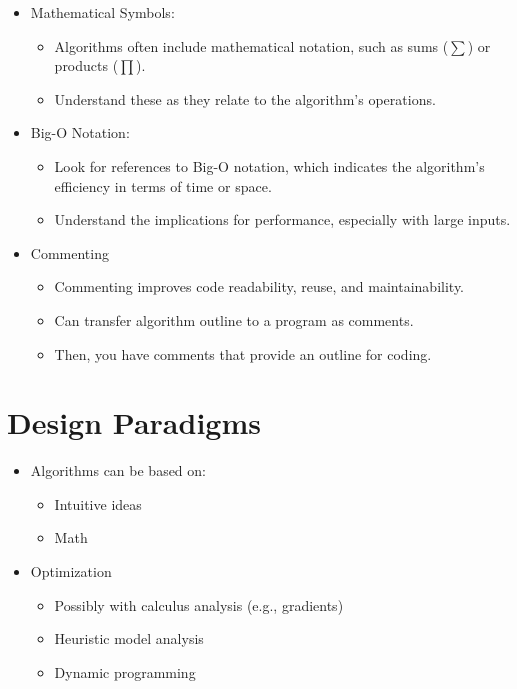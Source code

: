 \documentclass[
  letterpaper,
  DIV=11,
  numbers=noendperiod]{scrreprt}
\providecommand{\tightlist}{%
  \setlength{\itemsep}{0pt}\setlength{\parskip}{0pt}}\usepackage{longtable,booktabs,array}
\begin{document}
\begin{itemize}
\tightlist
\item
  Mathematical Symbols:

  \begin{itemize}
  \tightlist
  \item
    Algorithms often include mathematical notation, such as sums
    (\(\sum\)) or products (\(\prod\)).
  \item
    Understand these as they relate to the algorithm's operations.
  \end{itemize}
\item
  Big-O Notation:

  \begin{itemize}
  \tightlist
  \item
    Look for references to Big-O notation, which indicates the
    algorithm's efficiency in terms of time or space.
  \item
    Understand the implications for performance, especially with large
    inputs.
  \end{itemize}
\item
  Commenting

  \begin{itemize}
  \tightlist
  \item
    Commenting improves code readability, reuse, and maintainability.
  \item
    Can transfer algorithm outline to a program as comments.
  \item
    Then, you have comments that provide an outline for coding.
  \end{itemize}
\end{itemize}

\section{Design Paradigms}\label{design-paradigms}

\begin{itemize}
\tightlist
\item
  Algorithms can be based on:

  \begin{itemize}
  \tightlist
  \item
    Intuitive ideas
  \item
    Math
  \end{itemize}
\item
  Optimization

  \begin{itemize}
  \tightlist
  \item
    Possibly with calculus analysis (e.g., gradients)
  \item
    Heuristic model analysis
  \item
    Dynamic programming
  \end{itemize}
\end{itemize}
\end{document}
